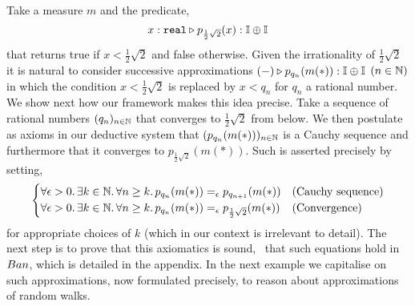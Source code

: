 \documentclass[a4paper,UKenglish,cleveref, autoref, thm-restate]{lipics-v2021}
\begin{document}
\begin{example}
        Take a measure $m$ and the predicate,
        \[
                x : \mathtt{real} \triangleright
                p_{\frac{1}{2}\sqrt{2}}(x) : \mathbb{I} \oplus \mathbb{I}
        \]
        that returns true if $x < \frac{1}{2}\sqrt{2}$ and false otherwise.
        Given the irrationality of $\frac{1}{2}\sqrt{2}$ it is natural to
        consider successive approximations $(-) \triangleright p_{q_n}(m(\ast))
        :  \mathbb{I} \oplus \mathbb{I}$ $(n \in \mathbb{N})$ in which the
        condition $x < \frac{1}{2}{\sqrt{2}}$ is replaced by $x < q_n$ for
        $q_n$ a rational number. We show next how our framework makes this idea
        precise. Take a sequence of rational numbers $(q_n)_{n \in \mathbb{N}}$ that
        converges to $\frac{1}{2}\sqrt{2}$ from below. We then postulate as
        axioms in our deductive system that $(p_{q_n}(m(\ast)))_{n \in \mathbb{N}}$ is a
        Cauchy sequence and furthermore that it converges to $p_{\frac{1}{2}
        \sqrt{2}}(m(\ast))$.  Such is asserted precisely by setting,
        \begin{equation}
                \label{eq:sound}
                \begin{cases}
                \forall \epsilon > 0. \, \exists k \in \mathbb{N}.
                \, \forall n \geq k. \, p_{q_n}(m(\ast)) =_\epsilon p_{q_{n+1}} (m(\ast))
                & \text{(Cauchy sequence)}
                \\
                \forall \epsilon > 0. \, \exists k \in \mathbb{N}.
                \, \forall n \geq k. \, p_{q_n}(m(\ast)) 
                =_\epsilon p_{\frac{1}{2} \sqrt{2}} (m(\ast))
                & \text{(Convergence)}
                \end{cases}
        \end{equation}
        for appropriate choices of $k$ (which in our context is irrelevant to
        detail). The next step is to prove that this axiomatics is sound, \ie\
        that such equations hold in $\Ban$, which is detailed in the appendix.
        In the next example we capitalise on such approximations, now
        formulated precisely, to reason about approximations of random walks.
        \end{example}
\end{document}
